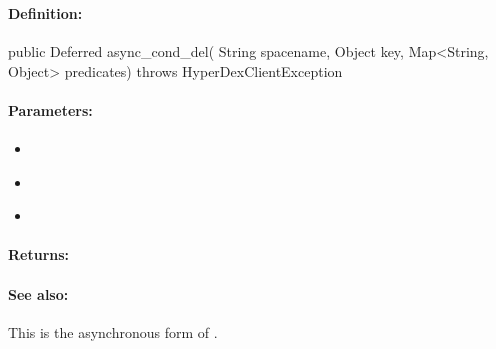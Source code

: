 \subsubsection{}
\label{api:java:async_cond_del}


\paragraph{Definition:}
\begin{javacode}
public Deferred async_cond_del(
        String spacename,
        Object key,
        Map<String, Object> predicates) throws HyperDexClientException
\end{javacode}

\paragraph{Parameters:}
\begin{itemize}[noitemsep]
\item {}\\

\item {}\\

\item {}\\

\end{itemize}

\paragraph{Returns:}


\paragraph{See also:}  This is the asynchronous form of .

\pagebreak
\subsubsection{}
\label{api:java:group_del}


